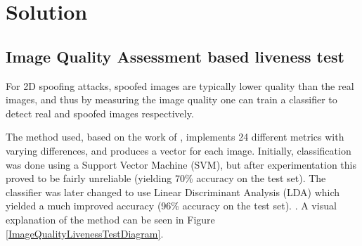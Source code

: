\documentclass[10pt,a4paper]{article}
\begin{document}
\section{Solution}
    \subsection{Image Quality Assessment based liveness test}
        For 2D spoofing attacks, spoofed images are typically lower quality than the real images, and thus by measuring the image quality
        one can train a classifier to detect real and spoofed images respectively.

        The method used, based on the work of \citet{ImageQualityAssessmentTest}, implements 24 different metrics with varying differences, and produces
        a vector for each image. Initially, classification was done using a Support Vector Machine (SVM), but after experimentation this proved to be fairly
        unreliable (yielding 70\% accuracy on the test set). The classifier was later changed to use Linear Discriminant Analysis (LDA) which yielded a much improved
        accuracy (96\% accuracy on the test set). .
        A visual explanation of the method can be seen in Figure \ref{ImageQualityLivenessTestDiagram}. 

\end{document}
